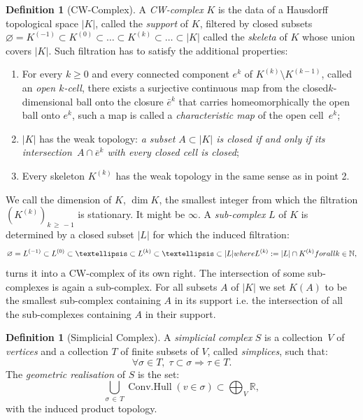 \documentclass[10pt]{amsart}
\providecommand{\Bar}{\overline}
\theoremstyle{definition}
\newtheorem{defi}[theo]{Definition}
\numberwithin{equation}{section}
\numberwithin{figure}{section}
\newcommand{\R}{\mathbb{R}}
\newcommand{\N}{\mathbb{N}}
\DeclareMathOperator{\convhull}{Conv.Hull}
\let\oldforall\forall
\renewcommand*{\forall}{\mathrel{\oldforall}}
\begin{document}
\begin{defi}[CW-Complex]
A \emph{CW-complex} $K$ is the data of a Hausdorff topological space $|K|$, called the \emph{support} of $K$, filtered by closed subsets $\varnothing=K^{(-1)}\subset K^{(0)}\subset\dots\subset K^{(k)}\subset\dots\subset |K|$ called the \emph{skeleta} of $K$ whose union covers $|K|$. Such filtration has to satisfy the additional properties:
\begin{enumerate}
\item For every $k\geq 0$ and every connected component $e^k$ of $ K^{(k)}\setminus K^{(k-1)}$, called an \emph{open $k$-cell}, there exists a surjective continuous map from the closed\linebreak $k$-dimensional ball onto the closure $\bar{e}^k$ that carries homeomorphically the open ball onto $e^k$, such a map is called a \emph{characteristic map} of the open cell~$e^k$;
\item $|K|$ has the weak topology: \emph{a subset $A\subset |K|$ is closed if and only if its intersection~$A\cap\Bar{e}^k$ with every closed cell is closed};
\item Every skeleton $K^{(k)}$ has the weak topology in the same sense as in point 2.
\end{enumerate}
We call the dimension of $K$, $\dim K$, the smallest integer from which the filtration $(K^{(k)})_{k\,\geq\,-1}$ is stationary. It might be $\infty$. A \emph{sub-complex} $L$ of $K$ is determined by a closed subset $|L|$ for which the induced filtration:
\begin{equation*}
\varnothing=L^{(-1)}\subset L^{(0)}\subset\dots\subset L^{(k)}\subset\dots\subset |L| \textnormal{ where }L^{(k)}:=|L|\cap K^{(k)} \textnormal{ for all }k\in \N,
\end{equation*}
turns it into a CW-complex of its own right. The intersection of some sub-complexes is again a sub-complex. For all subsets $A$ of $|K|$ we set $K(A)$ to be the smallest sub-complex containing $A$ in its support i.e. the intersection of all the sub-complexes containing $A$ in their support.
\end{defi}

\begin{defi}[Simplicial Complex]\label{def:simplicial_cpx}
A \emph{simplicial complex} $S$ is a collection~$V$ of \emph{vertices} and a collection $T$ of finite subsets of $V$, called \emph{simplices}, such that:
\begin{equation*}
\forall \sigma\in T,\; \tau\subset\sigma \Rightarrow \tau\in T.
\end{equation*}
The \emph{geometric realisation} of $S$ is the set:
\begin{equation*}
\bigcup_{\sigma\,\in\,T} \convhull(v\in\sigma) \subset \bigoplus_V\R,
\end{equation*}
with the induced product topology.
\end{defi}
\end{document}
